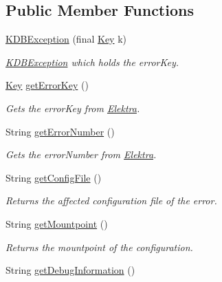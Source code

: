 \subsection*{Public Member Functions}
\begin{DoxyCompactItemize}
\item 
\hyperlink{classorg_1_1libelektra_1_1exception_1_1KDBException_a872741690ba68b12b14edc32e4675eef}{K\+D\+B\+Exception} (final \hyperlink{classorg_1_1libelektra_1_1Key}{Key} k)
\begin{DoxyCompactList}\small\item\em \hyperlink{classorg_1_1libelektra_1_1exception_1_1KDBException}{K\+D\+B\+Exception} which holds the error\+Key. \end{DoxyCompactList}\item 
\hyperlink{classorg_1_1libelektra_1_1Key}{Key} \hyperlink{classorg_1_1libelektra_1_1exception_1_1KDBException_a8fd8c0decfe1f1f6243407614d042101}{get\+Error\+Key} ()
\begin{DoxyCompactList}\small\item\em Gets the error\+Key from \hyperlink{interfaceorg_1_1libelektra_1_1Elektra}{Elektra}. \end{DoxyCompactList}\item 
String \hyperlink{classorg_1_1libelektra_1_1exception_1_1KDBException_a3d07f27121a4870471ea6927d93c04a9}{get\+Error\+Number} ()
\begin{DoxyCompactList}\small\item\em Gets the error\+Number from \hyperlink{interfaceorg_1_1libelektra_1_1Elektra}{Elektra}. \end{DoxyCompactList}\item 
String \hyperlink{classorg_1_1libelektra_1_1exception_1_1KDBException_ad963bf071d65028200f13f18bc355472}{get\+Config\+File} ()
\begin{DoxyCompactList}\small\item\em Returns the affected configuration file of the error. \end{DoxyCompactList}\item 
String \hyperlink{classorg_1_1libelektra_1_1exception_1_1KDBException_a7595349ac675e5b57616020d512b82d2}{get\+Mountpoint} ()
\begin{DoxyCompactList}\small\item\em Returns the mountpoint of the configuration. \end{DoxyCompactList}\item 
String \hyperlink{classorg_1_1libelektra_1_1exception_1_1KDBException_ad43f4032095b1bfa1dc5065c5e01f9bb}{get\+Debug\+Information} ()

\end{DoxyCompactItemize}
